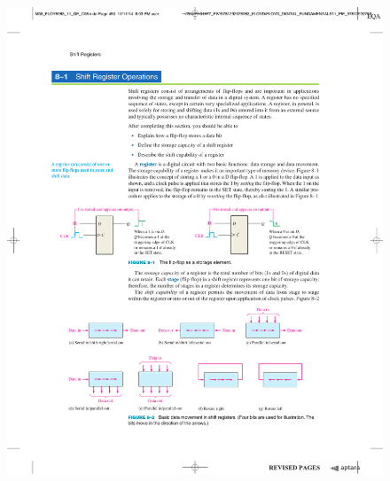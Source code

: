 \begin{figure}[H]
    \centering
    \hspace{0.88cm}
    \includegraphics[scale = 1]{Graphics/VHDL/Practice 5/SHIFT_REGISTER_BASICS/D-Latch_Operation_451_1.pdf}
\end{figure}

